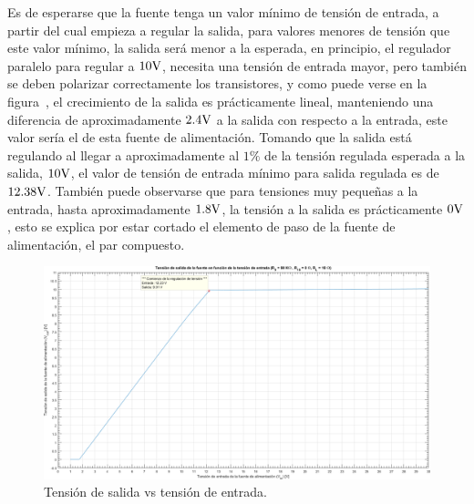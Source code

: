 \vspace{1.5cm}

Es de esperarse que la fuente tenga un valor mínimo de tensión de entrada, a partir del cual empieza a regular la salida, para valores menores de tensión que este valor mínimo, la salida será menor a la esperada, en principio, el regulador paralelo para regular a $10 \si[per-mode=symbol]{\volt}$, necesita una tensión de entrada mayor, pero también se deben polarizar correctamente los transistores, y como puede verse en la figura~, el crecimiento de la salida es prácticamente lineal, manteniendo una diferencia de aproximadamente $2.4 \si[per-mode=symbol]{\volt}$ a la salida con respecto a la entrada, este valor sería el  de esta fuente de alimentación. Tomando que la salida está regulando al 
llegar a aproximadamente al $1 \%$ de la tensión regulada esperada a la salida, $10 \si[per-mode=symbol]{\volt}$, el valor de tensión de entrada mínimo para salida regulada es de $12.38 \si[per-mode=symbol]{\volt}$. También puede observarse que para tensiones muy pequeñas a la entrada, hasta aproximadamente $1.8 \si[per-mode=symbol]{\volt}$, la tensión a la salida es prácticamente $0 \si[per-mode=symbol]{\volt}$, esto se explica por estar cortado el elemento de paso de la fuente de alimentación, el par compuesto.

\vfill

\clearpage

\begin{figure}[H] %
\begin{center}
\includegraphics[width=1.2 \textwidth, angle=90]{./img/preguntas/p18.png}
\caption{\label{fig:fig_p18_vo_vs_vi}\footnotesize{Tensión de salida vs tensión de entrada.}}
\end{center}
\end{figure}

\clearpage